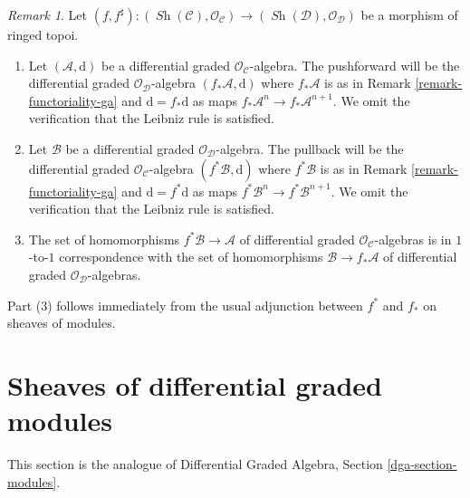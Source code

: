 \documentclass{stacks-project}
\theoremstyle{plain}
\theoremstyle{definition}
\theoremstyle{remark}
\newtheorem{remark}[subsection]{Remark}
\numberwithin{equation}{subsection}
\def\Sh{\mathop{\mathit{Sh}}\nolimits}
\begin{document}
\begin{remark}
\label{remark-functoriality-dga}
Let $(f, f^\sharp) : (\Sh(\mathcal{C}), \mathcal{O}_\mathcal{C})
\to (\Sh(\mathcal{D}), \mathcal{O}_\mathcal{D})$
be a morphism of ringed topoi.
\begin{enumerate}
\item Let $(\mathcal{A}, \text{d})$ be a differential graded
$\mathcal{O}_\mathcal{C}$-algebra. The pushforward will be
the differential graded $\mathcal{O}_\mathcal{D}$-algebra
$(f_*\mathcal{A}, \text{d})$ where $f_*\mathcal{A}$ is as in
Remark \ref{remark-functoriality-ga} and
$\text{d} = f_*\text{d}$ as maps $f_*\mathcal{A}^n \to f_*\mathcal{A}^{n + 1}$.
We omit the verification that the Leibniz rule is satisfied.
\item Let $\mathcal{B}$ be a differential graded
$\mathcal{O}_\mathcal{D}$-algebra. The pullback will be the
differential graded $\mathcal{O}_\mathcal{C}$-algebra
$(f^*\mathcal{B}, \text{d})$ where $f^*\mathcal{B}$ is as in
Remark \ref{remark-functoriality-ga} and
$\text{d} = f^*\text{d}$ as maps $f^*\mathcal{B}^n \to f^*\mathcal{B}^{n + 1}$.
We omit the verification that the Leibniz rule is satisfied.
\item The set of homomorphisms $f^*\mathcal{B} \to \mathcal{A}$
of differential graded $\mathcal{O}_\mathcal{C}$-algebras is in
$1$-to-$1$ correspondence with the set of homomorphisms
$\mathcal{B} \to f_*\mathcal{A}$ of differential graded
$\mathcal{O}_\mathcal{D}$-algebras.
\end{enumerate}
Part (3) follows immediately from the usual adjunction between $f^*$ and $f_*$
on sheaves of modules.
\end{remark}
















\section{Sheaves of differential graded modules}
\label{section-modules}

\noindent
This section is the analogue of
Differential Graded Algebra, Section \ref{dga-section-modules}.
\end{document}
